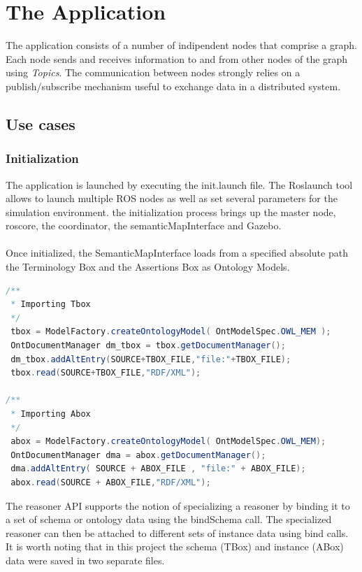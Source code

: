 \section{The Application}

The application consists of a number of indipendent nodes that comprise a graph. Each node sends and receives information to and from other nodes of the graph using \textit{Topics}.
The communication between nodes strongly relies on a publish/subscribe mechanism useful to  exchange data in a distributed system. 


\subsection{Use cases}

\subsubsection{Initialization}
The application is launched by executing the init.launch file. The Roslaunch tool allows to launch multiple ROS nodes as well as set several parameters for the simulation environment. the initialization process brings up the master node, roscore, the coordinator, the semanticMapInterface and Gazebo.\\
\\
Once initialized, the SemanticMapInterface loads from a specified absolute path the Terminology Box and the Assertions Box as Ontology Models.

\begin{lstlisting}[language=Java]
/**
 * Importing Tbox
 */
 tbox = ModelFactory.createOntologyModel( OntModelSpec.OWL_MEM );
 OntDocumentManager dm_tbox = tbox.getDocumentManager();
 dm_tbox.addAltEntry(SOURCE+TBOX_FILE,"file:"+TBOX_FILE);
 tbox.read(SOURCE+TBOX_FILE,"RDF/XML");

/**
 * Importing Abox
 */
 abox = ModelFactory.createOntologyModel( OntModelSpec.OWL_MEM);
 OntDocumentManager dma = abox.getDocumentManager();
 dma.addAltEntry( SOURCE + ABOX_FILE , "file:" + ABOX_FILE);
 abox.read(SOURCE + ABOX_FILE,"RDF/XML");
\end{lstlisting}

The reasoner API supports the notion of specializing a reasoner by binding it to a set of schema or ontology data using the bindSchema call. The specialized reasoner can then be attached to different sets of instance data using bind calls. It is worth noting that in this project the schema (TBox) and instance (ABox) data were saved in two separate files.

